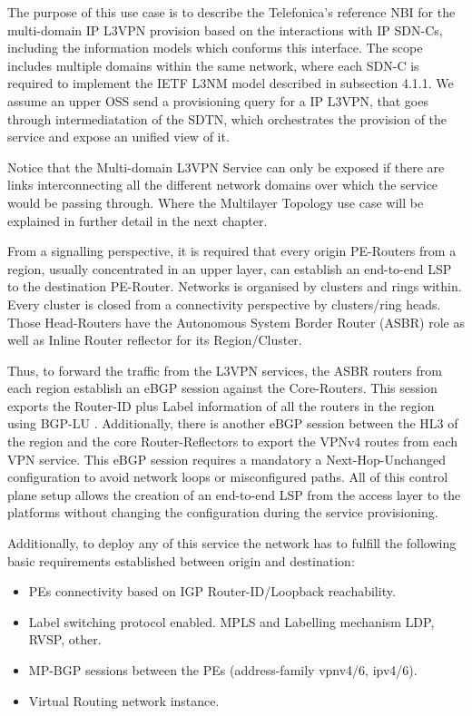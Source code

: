 \documentclass[a4paper,fleqn]{cas-dc}
\begin{document}
The purpose of this use case is to describe the Telefonica’s reference NBI for the multi-domain IP L3VPN provision based on the interactions with IP SDN-Cs, including the information models which conforms this interface. The scope includes multiple domains within the same network, where each SDN-C is required to implement the IETF L3NM model described in subsection 4.1.1. We assume an upper OSS send a provisioning query for a IP L3VPN,  that goes through intermediatation of the SDTN, which orchestrates the provision of the service and expose an unified view of it.

Notice that the Multi-domain L3VPN Service can only be exposed if there are links interconnecting all the different network domains over which the service would be passing through. Where the Multilayer Topology use case will be explained in further detail in the next chapter. 

From a signalling perspective, it is required that every origin PE-Routers from a region, usually concentrated in an upper layer, can establish an end-to-end LSP to the destination PE-Router. Networks is organised by clusters and rings within. Every cluster is closed from a connectivity perspective by clusters/ring heads. Those Head-Routers have the Autonomous System Border Router (ASBR) role as well as Inline Router reflector for its Region/Cluster. 

Thus, to forward the traffic from the L3VPN services, the ASBR routers from each region establish an eBGP session against the Core-Routers. This session exports the Router-ID plus Label information of all the routers in the region using BGP-LU \cite{rfc8277}. Additionally, there is another eBGP session between the HL3 of the region and the core Router-Reflectors to export the VPNv4 routes from each VPN service. This eBGP session requires a mandatory a Next-Hop-Unchanged configuration to avoid network loops or misconfigured paths. All of this control plane setup allows the creation of an end-to-end LSP from the access layer to the platforms without changing the configuration during the service provisioning.

Additionally, to deploy any of this service the network has to fulfill the following basic requirements established between origin and destination:
\begin{itemize}
    \item PEs connectivity based on IGP Router-ID/Loopback reachability.
    \item Label switching protocol enabled. MPLS and Labelling mechanism LDP, RVSP, other. 
    \item MP-BGP sessions between the PEs (address-family vpnv4/6, ipv4/6).
    \item Virtual Routing network instance. 
\end{itemize}
\end{document}
